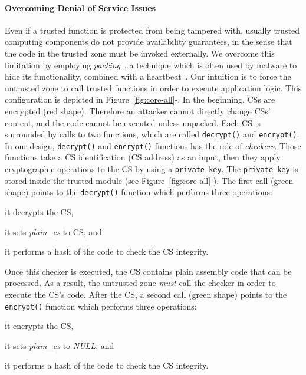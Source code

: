 \paragraph{\textbf{Overcoming Denial of Service Issues}}
Even if a trusted function is protected from being tampered with, usually 
trusted computing components do not provide availability guarantees, in the 
sense that the code in the trusted zone must be invoked externally.
We overcome this limitation by employing \emph{packing}~\cite{ugarte2016rambo}, 
a technique which is often used by malware to hide its functionality, combined 
with a heartbeat~\cite{ghosh2010secure}. %
Our intuition is to force the untrusted zone to call trusted functions in order 
to execute application logic.
This configuration is depicted in Figure~\ref{fig:core-all}-.
In the beginning, CSs are encrypted (red shape). Therefore an attacker cannot 
directly change CSs' content, and the code cannot be executed unless unpacked.
Each CS is surrounded by calls to two functions, which are called 
\texttt{decrypt()} and \texttt{encrypt()}.
In our design, \texttt{decrypt()} and \texttt{encrypt()} functions has the role 
of \emph{checkers}.
Those functions take a CS identification (\eg CS address) as an input, then 
they apply cryptographic operations to the CS by using a \texttt{private key}. 
The \texttt{private key} is stored inside the trusted module (see 
Figure~\ref{fig:core-all}-).
The first call (green shape) points to
the \texttt{decrypt()} function which performs three operations:
\begin{enumerate*}[label=(\roman*)]
	\item it decrypts the CS,
	\item it sets \emph{plain\_cs} to CS, and
	\item it performs a hash of the code to check the CS integrity.
\end{enumerate*}
Once this checker is executed, the CS contains plain assembly code that can be 
processed.
As a result, the untrusted zone \emph{must} call the checker in order to 
execute the CS's code.
After the CS, a second call (green shape) points to the \texttt{encrypt()} 
function which performs three operations:
\begin{enumerate*}[label=(\roman*)]
	\item it encrypts the CS,
	\item it sets \emph{plain\_cs} to \emph{NULL}, and
	\item it performs a hash of the code to check the CS integrity.
\end{enumerate*}
